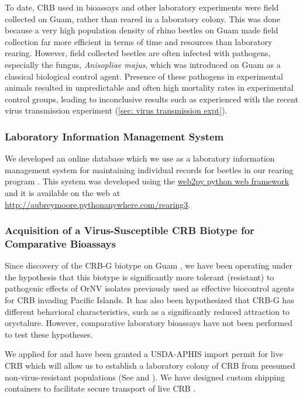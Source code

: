 \documentclass[12pt,
letterpaper,english,bibliography=totocnumbered, abstract=on]{scrartcl}
\begin{document}
To date, CRB used in bioassays and other laboratory experiments were field collected on Guam, rather than reared in a laboratory colony. This was done because a very high population density of rhino beetles on Guam made field collection far more efficient in terms of time and resources than laboratory rearing. However, field collected beetles are often infected with pathogens, especially the fungus, \textit{Anisopliae majus}, which was introduced on Guam as a classical biological control agent. Presence of these pathogens in experimental animals resulted in unpredictable and often high mortality rates in experimental control groups, leading to inconclusive results  such as experienced with the recent virus transmission experiment (\ref{sec: virus transmission expt}).

\subsubsection{Laboratory Information Management System}\label{lims}

We developed an online database which we use as a laboratory information management system for maintaining individual records for beetles in our rearing program \parencite{moore_coconut_2019-1}. This system was developed using the \href{http://www.web2py.com/}{web2py python web framework} and it is available on the web at \url{http://aubreymoore.pythonanywhere.com/rearing3}. 

\subsubsection{Acquisition of a Virus-Susceptible CRB Biotype for Comparative Bioassays}

Since discovery of the CRB-G biotype on Guam \parencite{marshall_new_2017-1}, we have been operating under the hypothesis that this biotype is significantly more tolerant (resistant) to pathogenic effects of OrNV isolates previously used as effective biocontrol agents for CRB invading Pacific Islands. It has also been hypothesized that CRB-G has different behavioral characteristics, such as a significantly reduced attraction to oryctalure. However, comparative laboratory bioassays have not been performed to test these hypotheses.

We applied for and have been granted a USDA-APHIS import permit for live CRB which will allow us to establish a laboratory colony of CRB from presumed non-virus-resistant populations (See \parencite{moore_additional_2019} and \parencite{usda-aphis_crb_2019}). We have designed custom shipping containers to facilitate secure transport of live CRB \parencite{moore_container_2017-1}.
\end{document}
